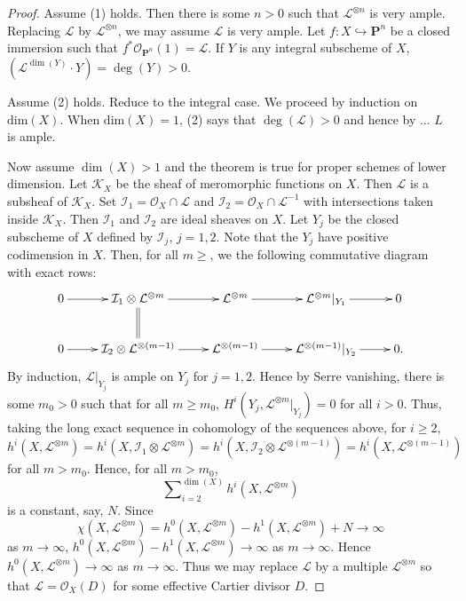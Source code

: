 \begin{proof}
Assume (1) holds.
Then there is some $n > 0$ such that $\mathcal{L}^{\otimes n}$ is very ample.
Replacing $\mathcal{L}$ by $\mathcal{L}^{\otimes n}$, we may assume
$\mathcal{L}$ is very ample.
Let $f : X \hookrightarrow \mathbf{P}^n$ be a closed immersion such that
$f^*\mathcal{O}_{\mathbf{P}^n}(1) = \mathcal{L}$.
If $Y$ is any integral subscheme of $X$,
$(\mathcal{L}^{\dim(Y)} \cdot Y) = \deg(Y) > 0$.

Assume (2) holds.
Reduce to the integral case.
We proceed by induction on $\mathrm{dim}(X)$.
When $\mathrm{dim}(X) = 1$, (2) says that $\deg(\mathcal{L}) > 0$ and hence
by ... $L$ is ample.

Now assume $\dim(X) > 1$ and the theorem is true for proper schemes of lower
dimension.
Let $\mathcal{K}_X$ be the sheaf of meromorphic functions on $X$.
Then $\mathcal{L}$ is a subsheaf of $\mathcal{K}_X$.
Set $\mathcal{I}_1 = \mathcal{O}_X \cap \mathcal{L}$
and $\mathcal{I}_2 = \mathcal{O}_X \cap \mathcal{L}^{-1}$ with intersections
taken inside $\mathcal{K}_X$.
Then $\mathcal{I}_1$ and $\mathcal{I}_2$ are ideal sheaves on $X$.
Let $Y_j$ be the closed subscheme of $X$ defined by $\mathcal{I}_j$, $j = 1,2$.
Note that the $Y_j$ have positive codimension in $X$.
Then, for all $m \geq $, we the following commutative diagram with exact rows:
$$
\xymatrix{
  0 \ar[r]
    & \mathcal{I}_1 \otimes \mathcal{L}^{\otimes m} \ar[r] \ar@{=}[d]
    & \mathcal{L}^{\otimes m} \ar[r]
    & \mathcal{L}^{\otimes m}\rvert_{Y_1} \ar[r]
    & 0 \\
  0 \ar[r]
    & \mathcal{I}_2 \otimes \mathcal{L}^{\otimes (m-1)} \ar[r]
    & \mathcal{L}^{\otimes (m-1)} \ar[r]
    & \mathcal{L}^{\otimes (m-1)}\rvert_{Y_2} \ar[r]
    & 0.
}
$$
By induction, $\mathcal{L}\rvert_{Y_j}$ is ample on $Y_j$ for $j = 1,2$.
Hence by Serre vanishing, there is some $m_0 > 0$
such that for all $m \geq m_0$,
$H^i(Y_j,\mathcal{L}^{\otimes m}\rvert_{Y_j}) = 0$ for all $i > 0$.
Thus, taking the long exact sequence in cohomology of the sequences above,
for $i \geq 2$,
$$
  h^i(X,\mathcal{L}^{\otimes m})
    = h^i(X,\mathcal{I}_1 \otimes \mathcal{L}^{\otimes m})
    = h^i(X,\mathcal{I}_2 \otimes \mathcal{L}^{\otimes (m - 1)})
    = h^i(X,\mathcal{L}^{\otimes (m-1)})
$$
for all $m > m_0$.
Hence, for all $m > m_0$,
$$
 \sum\nolimits_{i = 2}^{\dim(X)} h^i(X,\mathcal{L}^{\otimes m})
$$
is a constant, say, $N$.
Since
$$
  \chi(X,\mathcal{L}^{\otimes m})
    = h^0(X,\mathcal{L}^{\otimes m}) - h^1(X,\mathcal{L}^{\otimes m})
      + N \to \infty
$$
as $m \to \infty$,
$h^0(X,\mathcal{L}^{\otimes m}) - h^1(X,\mathcal{L}^{\otimes m}) \to \infty$
as $m \to \infty$.
Hence $h^0(X,\mathcal{L}^{\otimes m}) \to \infty$ as $m \to \infty$.
Thus we may replace $\mathcal{L}$ by a multiple $\mathcal{L}^{\otimes m}$
so that $\mathcal{L} = \mathcal{O}_X(D)$ for some effective Cartier divisor
$D$.


\end{proof}
